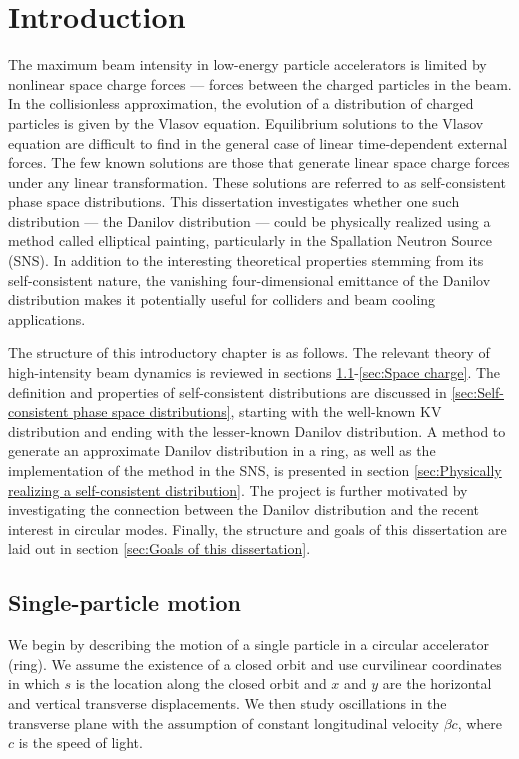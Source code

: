 \chapter{Introduction}\label{chap-1}

The maximum beam intensity in low-energy particle accelerators is limited by nonlinear space charge forces — forces between the charged particles in the beam. In the collisionless approximation, the evolution of a distribution of charged particles is given by the Vlasov equation. Equilibrium solutions to the Vlasov equation are difficult to find in the general case of linear time-dependent external forces. The few known solutions are those that generate linear space charge forces under any linear transformation. These solutions are referred to as self-consistent phase space distributions. This dissertation investigates whether one such distribution — the Danilov distribution — could be physically realized using a method called elliptical painting, particularly in the Spallation Neutron Source (SNS). In addition to the interesting theoretical properties stemming from its self-consistent nature, the vanishing four-dimensional emittance of the Danilov distribution makes it potentially useful for colliders and beam cooling applications.

The structure of this introductory chapter is as follows. The relevant theory of high-intensity beam dynamics is reviewed in sections \ref{sec:Single-particle motion}-\ref{sec:Space charge}. The definition and properties of self-consistent distributions are discussed in \ref{sec:Self-consistent phase space distributions}, starting with the well-known KV distribution and ending with the lesser-known Danilov distribution. A method to generate an approximate Danilov distribution in a ring, as well as the implementation of the method in the SNS, is presented in section \ref{sec:Physically realizing a self-consistent distribution}. The project is further motivated by investigating the connection between the Danilov distribution and the recent interest in circular modes. Finally, the structure and goals of this dissertation are laid out in section \ref{sec:Goals of this dissertation}.




\section{Single-particle motion}\label{sec:Single-particle motion}

We begin by describing the motion of a single particle in a circular accelerator (ring). We assume the existence of a closed orbit and use curvilinear coordinates in which $s$ is the location along the closed orbit and $x$ and $y$ are the horizontal and vertical transverse displacements. We then study oscillations in the transverse plane with the assumption of constant longitudinal velocity $\beta c$, where $c$ is the speed of light.

